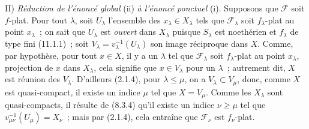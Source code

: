 \medskip
\noindent II) \emph{Réduction de l'énoncé global} (ii) \emph{à l'énoncé
ponctuel} (i). Supposons que $\mathcal F$ soit $f$-plat. Pour tout $\lambda$,
soit $U_\lambda$ l'ensemble des $x_\lambda\in X_\lambda$ tels que
$\mathcal F_\lambda$ soit $f_\lambda$-plat au point $x_\lambda$~; on sait
que $U_\lambda$ est \emph{ouvert} dans $X_\lambda$ puisque $S_\lambda$ est
noethérien et $f_\lambda$ de type fini (11.1.1)~; soit
$V_\lambda=v_\lambda^{-1}(U_\lambda)$ son image réciproque dans $X$. Comme,
par hypothèse, pour tout $x\in X$, il y a un $\lambda$ tel que
$\mathcal F_\lambda$ soit $f_\lambda$-plat au point $x_\lambda$, projection
de $x$ dans $X_\lambda$, cela signifie que $x\in V_\lambda$ pour un
$\lambda$~; autrement dit, $X$ est réunion des $V_\lambda$. D'ailleurs
(2.1.4), pour $\lambda\leq\mu$, on a $V_\lambda\subset V_\mu$, donc, comme
$X$ est quasi-compact, il existe un indice $\mu$ tel que $X=V_\mu$. Comme
les $X_\lambda$ sont quasi-compacts, il résulte de (8.3.4) qu'il existe un
indice $\nu\geq\mu$ tel que $v_{\mu\nu}^{-1}(U_\mu)=X_\nu$~; mais par
(2.1.4), cela entraîne que $\mathcal F_\nu$ est $f_\nu$-plat.

